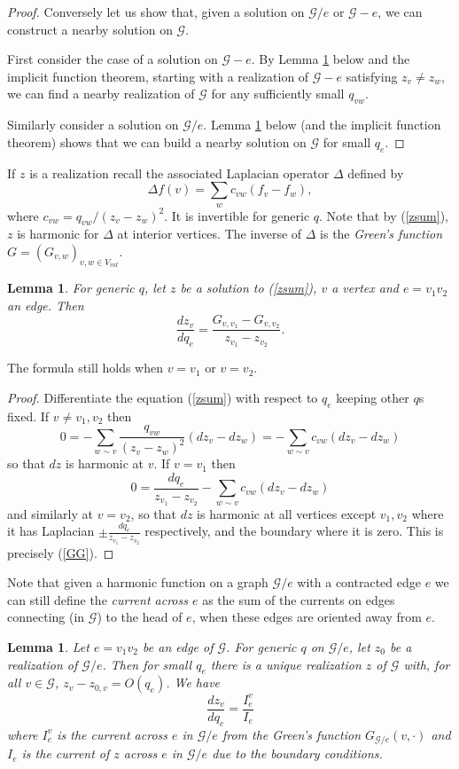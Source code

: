 \documentclass[12pt]{amsart}
\newtheorem{lemma}[theorem]{Lemma}
\newcommand{\G}{{\mathcal G}}
\newcommand{\be}{\begin{equation}}
\newcommand{\ee}{\end{equation}}
\begin{document}
\begin{proof}
Conversely let us show that, given a solution on $\G/e$ or $\G-e$, we can construct a nearby solution on $\G$. 

First consider the case of a solution on $\G-e$. By Lemma \ref{harmonic} below and the implicit function theorem, 
starting with a realization of $\G-e$ satisfying $z_v\ne z_w$, we can find a nearby realization of $\G$ for any sufficiently small $q_{vw}$.

Similarly consider a solution on $\G/e$. Lemma \ref{uncontract} below (and the implicit function theorem) 
shows that we can build a nearby solution on $\G$ for small $q_e$. 
\end{proof}


If $z$ is a realization recall the associated Laplacian operator $\Delta$ defined by 
$$\Delta f(v) = \sum_w c_{vw}(f_v-f_w),$$
where $c_{vw} = q_{vw}/(z_v-z_w)^2$. It is invertible for generic $q$.
Note that by (\ref{zsum}), $z$ is harmonic for $\Delta$ at interior vertices.
The inverse of $\Delta$ is the \emph{Green's function} $G=(G_{v,w})_{v,w\in V_{int}}$.

\begin{lemma}\label{harmonic}
For generic $q$, 
let $z$ be a solution to (\ref{zsum}), $v$ a vertex and $e=v_1v_2$ an edge. Then 
\be\label{GG}\frac{dz_v}{dq_e} = \frac{G_{v,v_1}-G_{v,v_2}}{z_{v_1}-z_{v_2}}.\ee
\end{lemma}

The formula still holds when $v=v_1$ or $v=v_2$.

\begin{proof}
Differentiate the equation (\ref{zsum}) with respect to $q_e$ keeping other $q$s fixed. If $v\ne v_1,v_2$ then
$$0= -\sum_{w\sim v}\frac{q_{vw}}{(z_v-z_w)^2}(dz_v-dz_w) = -\sum_{w\sim v}c_{vw}(dz_v-dz_w)$$
so that $dz$ is harmonic at $v$. 
If $v=v_1$ then 
$$0= \frac{dq_{e}}{z_{v_1}-z_{v_2}} - \sum_{w\sim v}c_{vw}(dz_v-dz_w)$$ and similarly at $v=v_2$,
so that $dz$ is harmonic at all vertices except $v_1,v_2$ where it has Laplacian 
$\pm\frac{dq_{e}}{z_{v_1}-z_{v_2}}$ respectively, and the boundary where it is zero. This is precisely (\ref{GG}).
\end{proof}

Note that given a harmonic function on a graph  $\G/e$ with a contracted edge $e$
we can still define the \emph{current across $e$} as the sum of the
currents on edges connecting (in $\G$) to the head of $e$, when these edges are oriented away from $e$.

\begin{lemma}\label{uncontract}
Let $e=v_1v_2$ be an edge of $\G$.
For generic $q$ on $\G/e$, let $z_0$ be a realization of $\G/e$. 
Then for small $q_e$ there is a unique realization $z$ of $\G$ with,  for all $v\in\G$, 
$z_v-z_{0,v}= O(q_e)$. We have $$\frac{dz_v}{dq_e} =\frac{I_e^v}{I_e}$$
where $I_{e}^v$ is the current across $e$ in $\G/e$ from the Green's function $G_{\G/e}(v,\cdot)$
and $I_{e}$ is the current of $z$ across $e$ in $\G/e$ due to the boundary conditions.
\end{lemma}
\end{document}
